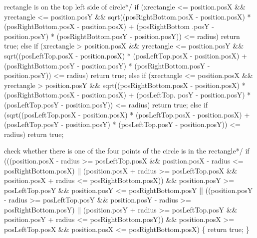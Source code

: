 \begin{DoxyCode}
 rectangle is on the top left side of circle*/
\textcolor{keywordflow}{if} (xrectangle <= position.posX && yrectangle <= position.posY
    && sqrt((posRightBottom.posX - position.posX) * (posRightBottom.posX - position.posX) + (posRightBottom
      .posY - position.posY) *
    (posRightBottom.posY - position.posY)) <= radius)
    \textcolor{keywordflow}{return} \textcolor{keyword}{true};
\textcolor{keywordflow}{else} \textcolor{keywordflow}{if} (xrectangle > position.posX && yrectangle <= position.posY
    && sqrt((posLeftTop.posX - position.posX) * (posLeftTop.posX - position.posX) + (posRightBottom.posY - 
      position.posY) *
    (posRightBottom.posY - position.posY)) <= radius)
    \textcolor{keywordflow}{return} \textcolor{keyword}{true};
\textcolor{keywordflow}{else} \textcolor{keywordflow}{if} (xrectangle <= position.posX && yrectangle > position.posY
    && sqrt((posRightBottom.posX - position.posX) * (posRightBottom.posX - position.posX) + (posLeftTop.
      posY - position.posY) *
    (posLeftTop.posY - position.posY)) <= radius)
    \textcolor{keywordflow}{return} \textcolor{keyword}{true};
\textcolor{keywordflow}{else} \textcolor{keywordflow}{if} (sqrt((posLeftTop.posX - position.posX) * (posLeftTop.posX - position.posX) + (posLeftTop.posY - 
      position.posY) *
    (posLeftTop.posY - position.posY)) <= radius)
    \textcolor{keywordflow}{return} \textcolor{keyword}{true};
\end{DoxyCode}



\begin{DoxyCode}
 check whether there is one of the four points of the circle is in the rectangle*/
\textcolor{keywordflow}{if} (((position.posX - radius >= posLeftTop.posX && position.posX - radius <= posRightBottom.posX) ||
    (position.posX + radius >= posLeftTop.posX && position.posX + radius <= posRightBottom.posX))
    && position.posY >= posLeftTop.posY && position.posY <= posRightBottom.posY ||
    ((position.posY - radius >= posLeftTop.posY && position.posY - radius >= posRightBottom.posY) ||
    (position.posY + radius >= posLeftTop.posY && position.posY + radius <= posRightBottom.posY)) &&
    position.posX >= posLeftTop.posX && position.posX <= posRightBottom.posX)
\{
    \textcolor{keywordflow}{return} \textcolor{keyword}{true};
\}
\end{DoxyCode}


